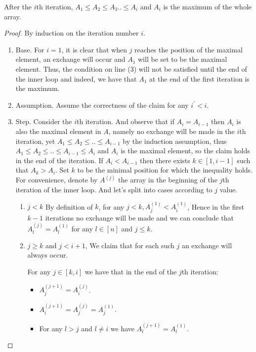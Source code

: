 \begin{claim}
  \label{claim:first}
  After the $i$th iteration, $A_{1} \le A_{2} \le A_{3} .. \le A_{i}$ and $A_{i}$ is the maximum of the whole array. 
\end{claim}
\begin{proof}
  By induction on the iteration number $i$. 
  \begin{enumerate}
    \item Base. For $i=1$, it is clear that when $j$ reaches the position of the maximal element, an exchange will occur and $A_{1}$ will be set to be the maximal element. Thus, the condition on line (3) will not be satisfied until the end of the inner loop and indeed, we have that $A_{1}$ at the end of the first iteration is the maximum.
    \item Assumption. Assume the correctness of the claim for any $i^{\prime} < i$. 
    \item Step. Consider the $i$th iteration. And observe that if $A_{i} = A_{i-1}$ then $A_{i}$ is also the maximal element in $A$, namely no exchange will be made in the $i$th iteration, yet $A_{1} \le A_{2} \le .. \le A_{i-1}$ by the induction assumption, thus  $A_{1} \le A_{2} \le .. \le A_{i-1} \le A_{i}$ and $A_{i}$ is the maximal element, so the claim holds in the end of the iteration. 
      If $A_{i} < A_{i-1}$ then there exists $k \in [1,i-1]$ such that $A_{k} > A_{i}$. Set $k$ to be the minimal position for which the inequality holds. For convenience, denote by $A^{(j)}$ the array in the beginning of the $j$th iteration of the inner loop. And let's split into cases according to $j$ value. 
      \begin{enumerate}
        \item $j < k$ By definition of $k$, for any $j < k, A^{(1)}_{j} < A^{(1)}_{i}$, Hence in the first $k-1$ iterations no exchange will be made and we can conclude that $A^{(j)}_{l} = A^{(1)}_{l}$ for any $l \in [n]$ and $j \le k$. 
        \item $j \ge k$ and $j<i+1$, We claim that for each such $j$ an exchange will always occur. 
          \begin{claim}
            For any $j \in [k,i]$ we have that in the end of the $j$th iteration:  
            \begin{itemize}
              \item $A^{(j+1)}_{j} = A^{(j)}_{i}$.
              \item $A^{(j+1)}_{i} = A^{(j)}_{j} = A^{(1)}_{j}$.
              \item For any $l > j$ and $l \neq i$ we have $A^{(j+1)}_{l} = A^{(1)}_{l}$.

\end{itemize}
\end{claim}
\end{enumerate}
\end{enumerate}
\end{proof}
